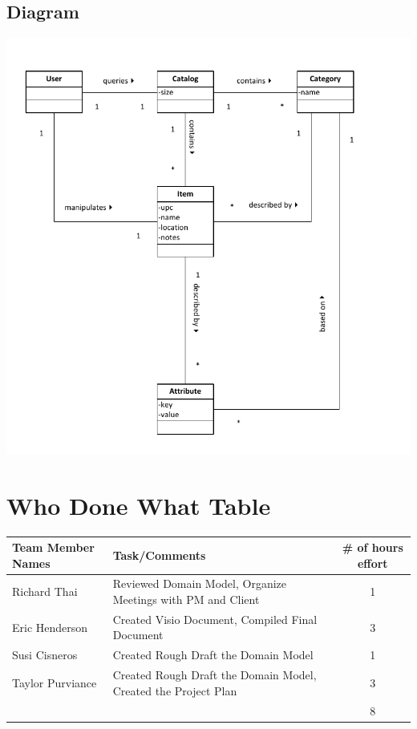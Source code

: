 \documentclass{article}
\begin{document}
\subsection{Diagram}
\includegraphics[keepaspectratio, width=6in]{domain_model.pdf}\\

\section{Who Done What Table}
\begin{tabular}{ | l | p{3in} | c | }
\hline
Team Member Names & Task/Comments & \# of hours effort\\
\hline
\hline
Richard Thai & Reviewed Domain Model, Organize Meetings with PM and Client & 1\\
\hline
Eric Henderson & Created Visio Document, Compiled Final Document & 3\\
\hline
Susi Cisneros & Created Rough Draft the Domain Model & 1\\
\hline
Taylor Purviance & Created Rough Draft the Domain Model, Created the Project Plan & 3\\
\hline
 &  & 8\\
\hline
\end{tabular}
\end{document}
